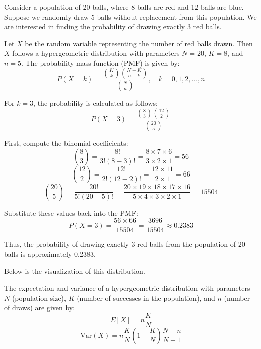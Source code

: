 \begin{example}
Consider a population of 20 balls, where 8 balls are red and 12 balls are blue. Suppose we randomly draw 5 balls without replacement from this population. We are interested in finding the probability of drawing exactly 3 red balls.

Let \(X\) be the random variable representing the number of red balls drawn. Then \(X\) follows a hypergeometric distribution with parameters \(N = 20\), \(K = 8\), and \(n = 5\). The probability mass function (PMF) is given by:
\[
P(X = k) = \frac{\binom{K}{k} \binom{N-K}{n-k}}{\binom{N}{n}}, \quad k = 0, 1, 2, \ldots, n
\]

For \(k = 3\), the probability is calculated as follows:
\[
P(X = 3) = \frac{\binom{8}{3} \binom{12}{2}}{\binom{20}{5}}
\]

First, compute the binomial coefficients:
\[
\binom{8}{3} = \frac{8!}{3! (8-3)!} = \frac{8 \times 7 \times 6}{3 \times 2 \times 1} = 56
\]
\[
\binom{12}{2} = \frac{12!}{2! (12-2)!} = \frac{12 \times 11}{2 \times 1} = 66
\]
\[
\binom{20}{5} = \frac{20!}{5! (20-5)!} = \frac{20 \times 19 \times 18 \times 17 \times 16}{5 \times 4 \times 3 \times 2 \times 1} = 15504
\]

Substitute these values back into the PMF:
\[
P(X = 3) = \frac{56 \times 66}{15504} = \frac{3696}{15504} \approx 0.2383
\]

Thus, the probability of drawing exactly 3 red balls from the population of 20 balls is approximately 0.2383.

Below is the visualization of this distribution.
\probtable

\begin{center}
\end{center}
\end{example}


\begin{theorem}
The expectation and variance of a hypergeometric distribution with parameters \(N\) (population size), \(K\) (number of successes in the population), and \(n\) (number of draws) are given by:
\[
E[X] = n \frac{K}{N}
\]
\[
\text{Var}(X) = n \frac{K}{N} \left(1 - \frac{K}{N}\right) \frac{N - n}{N - 1}
\]
\end{theorem}

